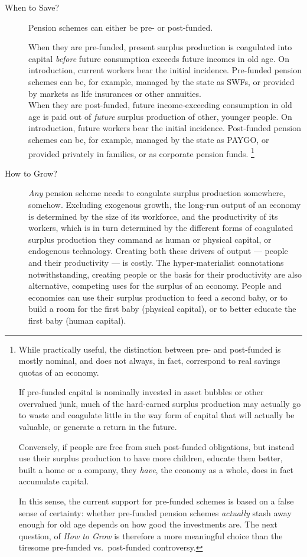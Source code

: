 \begin{description}
	\item[When to Save?]
	Pension schemes can either be pre- or post-funded.

	When they are pre-funded, present surplus production is coagulated into capital \emph{before} future consumption exceeds future incomes in old age.
	On introduction, current workers bear the initial incidence.
	Pre-funded pension schemes can be, for example, managed by the state as \glspl{SWF}, or provided by markets as life insurances or other annuities.\\
	When they are post-funded, future income-exceeding consumption in old age is paid out of \emph{future} surplus production of other, younger people.
	On introduction, future workers bear the initial incidence.
	Post-funded pension schemes can be, for example, managed by the state as PAYGO, or provided privately in families, or as corporate pension funds.
	\footnote{
		While practically useful, the distinction between pre- and post-funded is mostly nominal, and does not always, in fact, correspond to real savings quotas of an economy.

		If pre-funded capital is nominally invested in asset bubbles or other overvalued junk, much of the hard-earned surplus production may actually go to waste and coagulate little in the way form of capital that will actually be valuable, or generate a return in the future.

		Conversely, if people are free from such post-funded obligations, but instead use their surplus production to have more children, educate them better, built a home or a company, they \emph{have}, the economy as a whole, does in fact accumulate capital.

		In this sense, the current support for pre-funded schemes is based on a false sense of certainty:
		whether pre-funded pension schemes \emph{actually} stash away enough for old age depends on how good the investments are.
		The next question, of \emph{How to Grow} is therefore a more meaningful choice than the tiresome pre-funded vs.\ post-funded controversy.
	}

	\item[How to Grow?]
	\emph{Any} pension scheme needs to coagulate surplus production somewhere, somehow.
	Excluding exogenous growth, the long-run output of an economy is determined by the size of its workforce, and the productivity of its workers, which is in turn determined by the different forms of coagulated surplus production they command as human or physical capital, or endogenous technology.
	Creating both these drivers of output --- people and their productivity --- is costly.
	The hyper-materialist connotations notwithstanding, creating people or the basis for their productivity are also alternative, competing uses for the surplus of an economy.
	People and economies can use their surplus production to feed a second baby, or to build a room for the first baby (physical capital), or to better educate the first baby (human capital).


\end{description}

